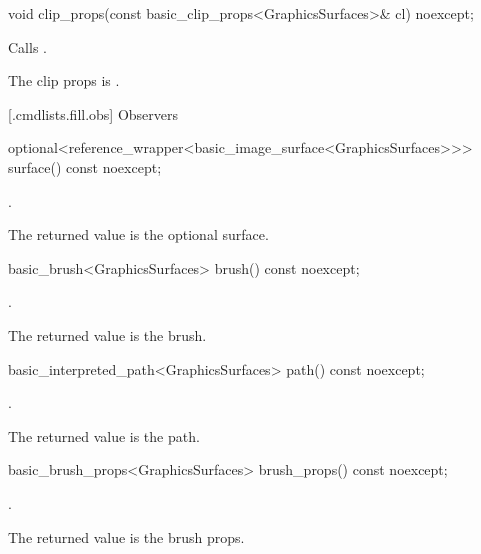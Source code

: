 %
\begin{itemdecl}
void clip_props(const basic_clip_props<GraphicsSurfaces>& cl) noexcept;
\end{itemdecl}
\begin{itemdescr}
\pnum
\effects Calls .

\pnum
\remarks The clip props is .
\end{itemdescr}

 [\iotwod.cmdlists.fill.obs] {Observers}%

%
\begin{itemdecl}
optional<reference_wrapper<basic_image_surface<GraphicsSurfaces>>> 
  surface() const noexcept;
\end{itemdecl}
\begin{itemdescr}
\pnum
\returns {}.

\pnum
\remarks
The returned value is the optional surface.
\end{itemdescr}

%
\begin{itemdecl}
basic_brush<GraphicsSurfaces> brush() const noexcept;
\end{itemdecl}
\begin{itemdescr}
\pnum
\returns {}.

\pnum
\remarks The returned value is the brush.
\end{itemdescr}

%
\begin{itemdecl}
basic_interpreted_path<GraphicsSurfaces> path() const noexcept;
\end{itemdecl}
\begin{itemdescr}
\pnum
\returns {}.

\pnum
\remarks The returned value is the path.
\end{itemdescr}

%
\begin{itemdecl}
basic_brush_props<GraphicsSurfaces> brush_props() const noexcept;
\end{itemdecl}
\begin{itemdescr}
\pnum
\returns {}.

\pnum
\remarks The returned value is the brush props.
\end{itemdescr}


